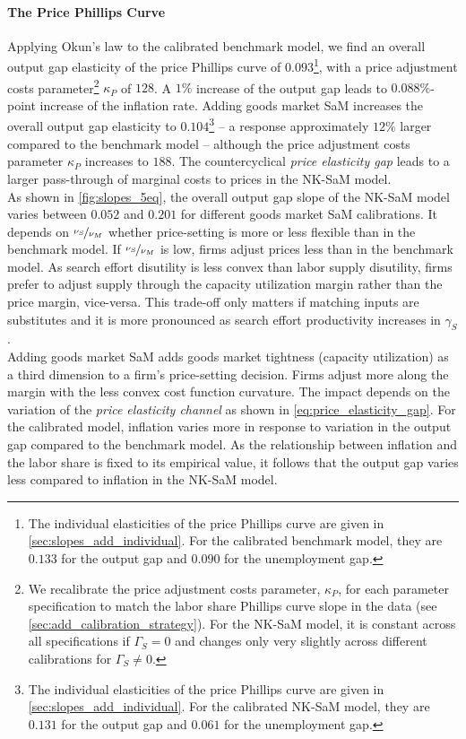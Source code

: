 \documentclass[12pt,3p,authoryear,review]{elsarticle}
\begin{document}
\paragraph{The Price Phillips Curve}%
Applying Okun's law to the calibrated benchmark model, we find an overall output gap elasticity of the price Phillips curve of $0.093$\footnote{The individual elasticities of the price Phillips curve are given in \ref{sec:slopes_add_individual}. For the calibrated benchmark model, they are $0.133$ for the output gap and $0.090$ for the unemployment gap.}, with a price adjustment costs parameter\footnote{We recalibrate the price adjustment costs parameter, $\kappa_P$, for each parameter specification to match the labor share Phillips curve slope in the data (see \ref{sec:add_calibration_strategy}). For the NK-SaM model, it is constant across all specifications if $\Gamma_S=0$ and changes only very slightly across different calibrations for $\Gamma_S \neq 0$.} $\kappa_P$ of $128$. A $1\%$ increase of the output gap leads to $0.088\%$-point increase of the inflation rate. Adding goods market SaM increases the overall output gap elasticity to $0.104$\footnote{The individual elasticities of the price Phillips curve are given in \ref{sec:slopes_add_individual}. For the calibrated NK-SaM model, they are $0.131$ for the output gap and $0.061$ for the unemployment gap.} -- a response approximately $12\%$ larger compared to the benchmark model -- although the price adjustment costs parameter $\kappa_P$ increases to $188$. The countercyclical \emph{price elasticity gap} leads to a larger pass-through of marginal costs to prices in the NK-SaM model.\\%
As shown in \cref{fig:slopes_5eq}, the overall output gap slope of the NK-SaM model varies between $0.052$ and $0.201$ for different goods market SaM calibrations. It depends on $\nicefrac{\nu_S}{\nu_M}$ whether price-setting is more or less flexible than in the benchmark model. If $\nicefrac{\nu_S}{\nu_M}$ is low, firms adjust prices less than in the benchmark model. As search effort disutility is less convex than labor supply disutility, firms prefer to adjust supply through the capacity utilization margin rather than the price margin, vice-versa. This trade-off only matters if matching inputs are substitutes and it is more pronounced as search effort productivity increases in $\gamma_S$.\\%
Adding goods market SaM adds goods market tightness (capacity utilization) as a third dimension to a firm's price-setting decision. Firms adjust more along the margin with the less convex cost function curvature. The impact depends on the variation of the \emph{price elasticity channel} as shown in \eqref{eq:price_elasticity_gap}. For the calibrated model, inflation varies more in response to variation in the output gap compared to the benchmark model. As the relationship  between inflation and the labor share is fixed to its empirical value, it follows that the output gap varies less compared to inflation in the NK-SaM model.%
\end{document}
